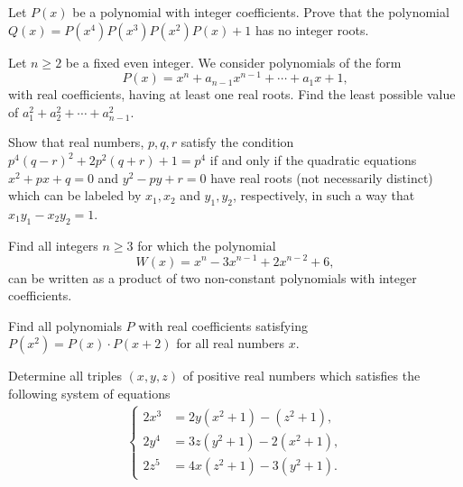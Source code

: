 \begin{question}[name={2000 Czech and Slovak}]
    Let $P(x)$ be a polynomial with integer coefficients. Prove that the polynomial $Q(x) = P(x^4)P(x^3)P(x^2)P(x)+1$ has no integer roots.
\end{question}



\begin{question}[name={2002 Czech and Slovak}]
    Let $n \ge 2$ be a fixed even integer. We consider polynomials of the form \[P(x) = x^n + a_{n-1}x^{n-1} + \cdots + a_1x + 1,\]
    with real coefficients, having at least one real roots. Find the least possible value of $a^2_1 + a^2_2 + \cdots + a^2_{n-1}$.
\end{question}


\begin{question}[name={2004 Czech and Slovak}]
    Show that real numbers, $p, q, r$ satisfy the condition $p^4(q-r)^2 + 2p^2(q+r) + 1 = p^4$ if and only if the quadratic equations $x^2 + px + q = 0$ and $y^2 - py + r = 0$ have real roots (not necessarily distinct) which can be labeled by $x_1,x_2$ and $y_1,y_2$, respectively, in such a way that $x_1y_1 - x_2y_2 = 1$.
\end{question}


\begin{question}[name={2005 Czech and Slovak}]
    Find all integers $n \ge 3$ for which the polynomial
    \[W(x) = x^n - 3x^{n-1} + 2x^{n-2} + 6,\]
    can be written as a product of two non-constant polynomials with integer coefficients.
\end{question}


\begin{question}[name={2007 Czech and Slovak}]
    Find all polynomials $P$ with real coefficients satisfying $P(x^2)=P(x)\cdot P(x+2)$ for all real numbers $x$.
\end{question}



\begin{question}[name={2008 Czech and Slovak}]
    Determine all triples $(x, y, z)$ of positive real numbers which satisfies the following system of equations
    \begin{align*}
        \begin{cases}
            2x^3 &= 2y(x^2+1)-(z^2+1),\\
            2y^4 &= 3z(y^2+1)-2(x^2+1),\\
            2z^5 &= 4x(z^2+1)-3(y^2+1).
        \end{cases}
    \end{align*}
\end{question}


